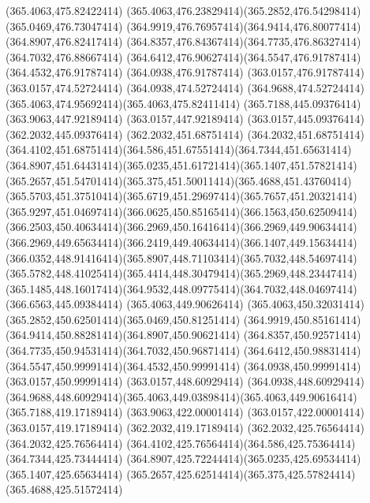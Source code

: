{{	\closepath
	\moveto(365.4063,475.82422414)
	\curveto(365.4063,476.23829414)(365.2852,476.54298414)(365.0469,476.73047414)
	\curveto(364.9919,476.76957414)(364.9414,476.80077414)(364.8907,476.82417414)
	\curveto(364.8357,476.84367414)(364.7735,476.86327414)(364.7032,476.88667414)
	\curveto(364.6412,476.90627414)(364.5547,476.91787414)(364.4532,476.91787414)
	\lineto(364.0938,476.91787414)
	\lineto(363.0157,476.91787414)
	\lineto(363.0157,474.52724414)
	\lineto(364.0938,474.52724414)
	\curveto(364.9688,474.52724414)(365.4063,474.95692414)(365.4063,475.82411414)
	\closepath
	\moveto(365.7188,445.09376414)
	\lineto(363.9063,447.92189414)
	\lineto(363.0157,447.92189414)
	\lineto(363.0157,445.09376414)
	\lineto(362.2032,445.09376414)
	\lineto(362.2032,451.68751414)
	\lineto(364.2032,451.68751414)
	\curveto(364.4102,451.68751414)(364.586,451.67551414)(364.7344,451.65631414)
	\curveto(364.8907,451.64431414)(365.0235,451.61721414)(365.1407,451.57821414)
	\curveto(365.2657,451.54701414)(365.375,451.50011414)(365.4688,451.43760414)
	\curveto(365.5703,451.37510414)(365.6719,451.29697414)(365.7657,451.20321414)
	\curveto(365.9297,451.04697414)(366.0625,450.85165414)(366.1563,450.62509414)
	\curveto(366.2503,450.40634414)(366.2969,450.16416414)(366.2969,449.90634414)
	\curveto(366.2969,449.65634414)(366.2419,449.40634414)(366.1407,449.15634414)
	\curveto(366.0352,448.91416414)(365.8907,448.71103414)(365.7032,448.54697414)
	\curveto(365.5782,448.41025414)(365.4414,448.30479414)(365.2969,448.23447414)
	\curveto(365.1485,448.16017414)(364.9532,448.09775414)(364.7032,448.04697414)
	\lineto(366.6563,445.09384414)
	\closepath
	\moveto(365.4063,449.90626414)
	\curveto(365.4063,450.32031414)(365.2852,450.62501414)(365.0469,450.81251414)
	\curveto(364.9919,450.85161414)(364.9414,450.88281414)(364.8907,450.90621414)
	\curveto(364.8357,450.92571414)(364.7735,450.94531414)(364.7032,450.96871414)
	\curveto(364.6412,450.98831414)(364.5547,450.99991414)(364.4532,450.99991414)
	\lineto(364.0938,450.99991414)
	\lineto(363.0157,450.99991414)
	\lineto(363.0157,448.60929414)
	\lineto(364.0938,448.60929414)
	\curveto(364.9688,448.60929414)(365.4063,449.03898414)(365.4063,449.90616414)
	\closepath
	\moveto(365.7188,419.17189414)
	\lineto(363.9063,422.00001414)
	\lineto(363.0157,422.00001414)
	\lineto(363.0157,419.17189414)
	\lineto(362.2032,419.17189414)
	\lineto(362.2032,425.76564414)
	\lineto(364.2032,425.76564414)
	\curveto(364.4102,425.76564414)(364.586,425.75364414)(364.7344,425.73444414)
	\curveto(364.8907,425.72244414)(365.0235,425.69534414)(365.1407,425.65634414)
	\curveto(365.2657,425.62514414)(365.375,425.57824414)(365.4688,425.51572414)
}}
